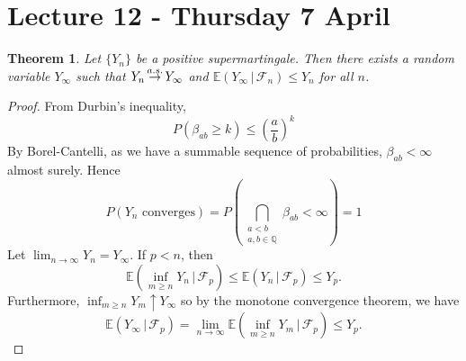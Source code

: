 \documentclass[10pt, oneside, reqno]{amsart}
\theoremstyle{plain}%
\newtheorem{thm}{Theorem}[section]
\theoremstyle{definition}
\theoremstyle{remark}
\newcommand{\given}{ \, | \,}
\newcommand{\sigf}{\mathcal{F}}
\newcommand{\Q}{\mathbb{Q}}
\newcommand{\E}{\mathbb{E}}
\def\cas{\,{\buildrel a.s. \over \rightarrow}\,}
\begin{document}

\section{Lecture 12 - Thursday 7 April} %
\label{sec:lecture_12_thursday_7_april}
\begin{thm}
    Let $\{ Y_n \}$ be a positive supermartingale.  Then there exists a random variable $Y_\infty$ such that $Y_n \cas Y_\infty$ and $\E(Y_\infty \given \sigf_n) \leq Y_n$ for all $n$.
\end{thm}
\begin{proof}
    From Durbin's inequality, \[
        P(\beta_{ab} \geq k) \leq \left( \frac{a}{b} \right)^k
    \]  By Borel-Cantelli, as we have a summable sequence of probabilities, $\beta_{ab}  < \infty$ almost surely.  Hence \[
        P(\text{$Y_n$ converges}) = P\left(\bigcap_{\substack{a < b \\ a, b \in \Q}} \beta_{ab} < \infty \right) = 1
    \] Let $\lim_{n \rightarrow \infty}Y_n = Y_\infty$. If $p < n$, then \[
        \E\left( \inf_{m \geq n} Y_n \given \sigf_p \right) \leq \E(Y_n \given \sigf_p) \leq Y_p.   \]  Furthermore, $\inf_{m \geq n} Y_m \uparrow Y_\infty$ so by the monotone convergence theorem, we have \[
            \E(Y_\infty \given \sigf_p) = \lim_{n \rightarrow \infty} \E\left( \inf_{m \geq n} Y_m \given \sigf_p \right) \leq Y_p.
        \]  
\end{proof}
\end{document}
